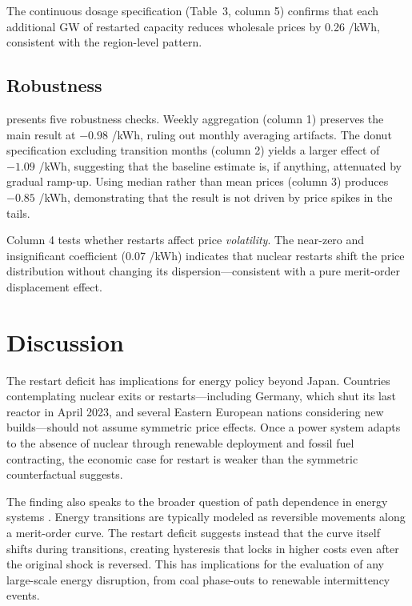 \documentclass[12pt]{article}
\newcommand{\yen}{\textyen}
\begin{document}
The continuous dosage specification (Table~3, column 5) confirms that each additional GW of restarted capacity reduces wholesale prices by 0.26 \yen/kWh, consistent with the region-level pattern.



\subsection{Robustness}

 presents five robustness checks. Weekly aggregation (column 1) preserves the main result at $-0.98$ \yen/kWh, ruling out monthly averaging artifacts. The donut specification excluding transition months (column 2) yields a larger effect of $-1.09$ \yen/kWh, suggesting that the baseline estimate is, if anything, attenuated by gradual ramp-up. Using median rather than mean prices (column 3) produces $-0.85$ \yen/kWh, demonstrating that the result is not driven by price spikes in the tails.

Column 4 tests whether restarts affect price \textit{volatility}. The near-zero and insignificant coefficient (0.07 \yen/kWh) indicates that nuclear restarts shift the price distribution without changing its dispersion---consistent with a pure merit-order displacement effect.




\section{Discussion}
\label{sec:discussion}

The restart deficit has implications for energy policy beyond Japan. Countries contemplating nuclear exits or restarts---including Germany, which shut its last reactor in April 2023, and several Eastern European nations considering new builds---should not assume symmetric price effects. Once a power system adapts to the absence of nuclear through renewable deployment and fossil fuel contracting, the economic case for restart is weaker than the symmetric counterfactual suggests.

The finding also speaks to the broader question of path dependence in energy systems \citep{Arthur1989, Unruh2000}. Energy transitions are typically modeled as reversible movements along a merit-order curve. The restart deficit suggests instead that the curve itself shifts during transitions, creating hysteresis that locks in higher costs even after the original shock is reversed. This has implications for the evaluation of any large-scale energy disruption, from coal phase-outs to renewable intermittency events.
\end{document}
